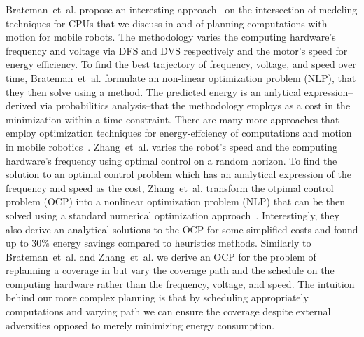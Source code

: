 Brateman~et~al. propose an interesting approach~\citep{brateman2006energy} on the intersection of medeling techniques for CPUs that we discuss in  and of planning computations with motion for mobile robots. The methodology varies the computing hardware's frequency and voltage via DFS and DVS respectively and the motor's speed for energy efficiency. To find the best trajectory of frequency, voltage, and speed over time, Brateman~et~al. formulate an non-linear optimization problem (NLP), that they then solve using a  method. The predicted energy is an anlytical expression--derived via probabilitics analysis--that the methodology employs as a cost in the minimization within a time constraint. 
There are many more approaches that employ optimization techniques for energy-effciency of computations and motion in mobile robotics~\citep{zhang2007low,ondruska2015scheduled,lahijanian2018resource}. Zhang~et~al. varies the robot's speed and the computing hardware's frequency using optimal control on a random horizon. To find the solution to an optimal control problem which has an analytical expression of the frequency and speed as the cost, Zhang~et~al. transform the otpimal control problem (OCP) into a nonlinear optimization problem (NLP) that can be then solved using a standard numerical optimization approach~\citep{zhang2007low}. Interestingly, they also derive an analytical solutions to the OCP for some simplified costs and found up to 30\% energy savings compared to heuristics methods. Similarly to Brateman~et~al. and Zhang~et~al. we derive an OCP for the problem of replanning a coverage in  but vary the coverage path and the schedule on the computing hardware rather than the frequency, voltage, and speed. The intuition behind our more complex planning is that by scheduling appropriately computations and varying path we can ensure the coverage despite external adversities opposed to merely minimizing energy consumption.

